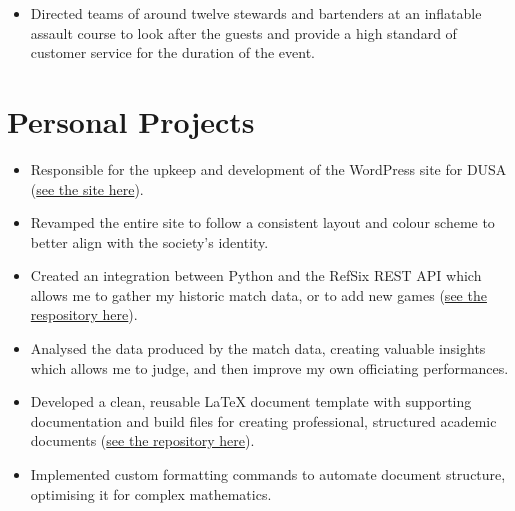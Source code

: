 \begin{itemize}
    \item Directed teams of around twelve stewards and bartenders at an inflatable assault course to look after the guests and provide a high standard of customer service for the duration of the event.
\end{itemize}

\section*{Personal Projects}

\begin{itemize}
    \item Responsible for the upkeep and development of the WordPress site for DUSA (\href{https://speleologicalassociation.webspace.durham.ac.uk/}{see the site here}). 
    \item Revamped the entire site to follow a consistent layout and colour scheme to better align with the society's identity.
\end{itemize}

\begin{itemize}
    \item Created an integration between Python and the RefSix REST API which allows me to gather my historic match data, or to add new games (\href{https://github.com/MatthewEmer/REFSIX-Data}{see the respository here}).
    \item Analysed the data produced by the match data, creating valuable insights which allows me to judge, and then improve my own officiating performances.
\end{itemize}

\begin{itemize}
    \item Developed a clean, reusable LaTeX document template with supporting documentation and build files for creating professional, structured academic documents (\href{https://github.com/MatthewEmer/LaTeX-File-Template}{see the repository here}).
    \item Implemented custom formatting commands to automate document structure, optimising it for complex mathematics.
\end{itemize}

